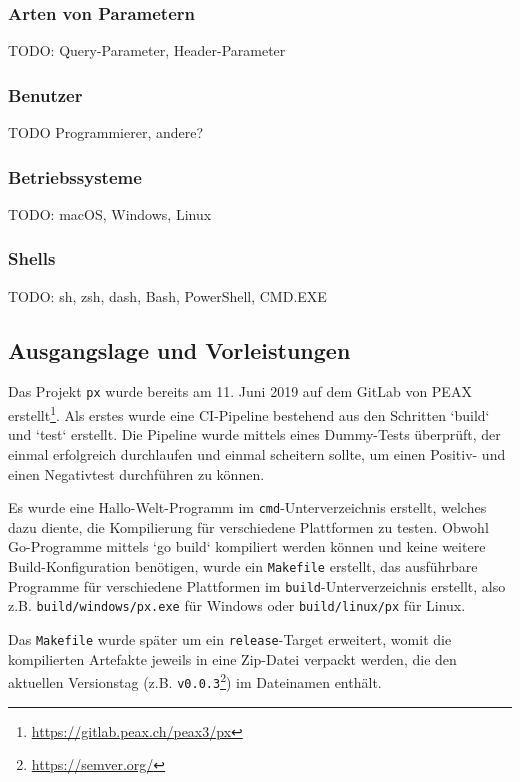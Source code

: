 \subsubsection{Arten von Parametern}

TODO: Query-Parameter, Header-Parameter

\subsubsection{Benutzer}

TODO Programmierer, andere?

\subsubsection{Betriebssysteme}

TODO: macOS, Windows, Linux

\subsubsection{Shells} 

TODO: sh, zsh, dash, Bash, PowerShell, CMD.EXE

\subsection{Ausgangslage und Vorleistungen}

Das Projekt \texttt{px} wurde bereits am 11. Juni 2019 auf dem GitLab von PEAX erstellt\footnote{\url{https://gitlab.peax.ch/peax3/px}}. Als erstes wurde eine CI-Pipeline bestehend aus den Schritten `build` und `test` erstellt. Die Pipeline wurde mittels eines Dummy-Tests überprüft, der einmal erfolgreich durchlaufen und einmal scheitern sollte, um einen Positiv- und einen Negativtest durchführen zu können.

Es wurde eine Hallo-Welt-Programm im \texttt{cmd}-Unterverzeichnis \cite[p. 293]{gopl} erstellt, welches dazu diente, die Kompilierung für verschiedene Plattformen zu testen. Obwohl Go-Programme mittels `go build` kompiliert werden können und keine weitere Build-Konfiguration benötigen, wurde ein \texttt{Makefile} erstellt, das ausführbare Programme für verschiedene Plattformen im \texttt{build}-Unterverzeichnis erstellt, also z.B. \texttt{build/windows/px.exe} für Windows oder \texttt{build/linux/px} für Linux.

Das \texttt{Makefile} wurde später um ein \texttt{release}-Target erweitert, womit die kompilierten Artefakte jeweils in eine Zip-Datei verpackt werden, die den aktuellen Versionstag (z.B. \texttt{v0.0.3}\footnote{\url{https://semver.org/}}) im Dateinamen enthält.


